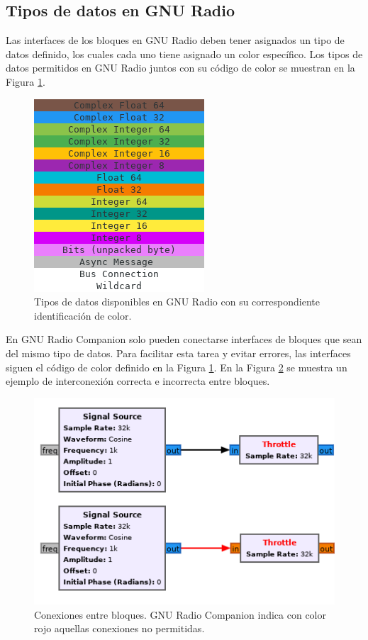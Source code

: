 \subsection{Tipos de datos en GNU Radio}
Las interfaces de los bloques en GNU Radio deben tener asignados un tipo de datos definido, los cuales cada uno tiene asignado un color específico. Los tipos de datos permitidos en GNU Radio juntos con su código de color se muestran en la Figura \ref{fig:gr_datatypes}.
\begin{figure}[ht!]
    \centering
    \includegraphics[width=0.5\linewidth]{images/07-GNURadio/gr_datatypes.png}
    \caption{Tipos de datos disponibles en GNU Radio con su correspondiente identificación de color.}
    \label{fig:gr_datatypes}
\end{figure}

En GNU Radio Companion solo pueden conectarse interfaces de bloques que sean del mismo tipo de datos. Para facilitar esta tarea y evitar errores, las interfaces siguen el código de color definido en la Figura \ref{fig:gr_datatypes}. En la Figura \ref{fig:gr_blockconnection} se muestra un ejemplo de interconexión correcta e incorrecta entre bloques.

\begin{figure}[ht!]
    \centering
    \includegraphics[width=0.6\linewidth]{images/07-GNURadio/gr_blockconnection.png}
    \caption{Conexiones entre bloques. GNU Radio Companion indica con color rojo aquellas conexiones no permitidas.}
    \label{fig:gr_blockconnection}
\end{figure}


